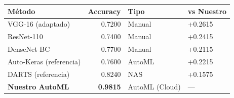 \begin{tabular}{lrll}
\toprule
Método & Accuracy & Tipo & vs Nuestro \\
\midrule
VGG-16 (adaptado) & 0.7200 & Manual & +0.2615 \\
ResNet-110 & 0.7400 & Manual & +0.2415 \\
DenseNet-BC & 0.7700 & Manual & +0.2115 \\
Auto-Keras (referencia) & 0.7600 & AutoML & +0.2215 \\
DARTS (referencia) & 0.8240 & NAS & +0.1575 \\
\midrule
\textbf{Nuestro AutoML} & \textbf{0.9815} & AutoML (Cloud) & --- \\
\bottomrule
\end{tabular}